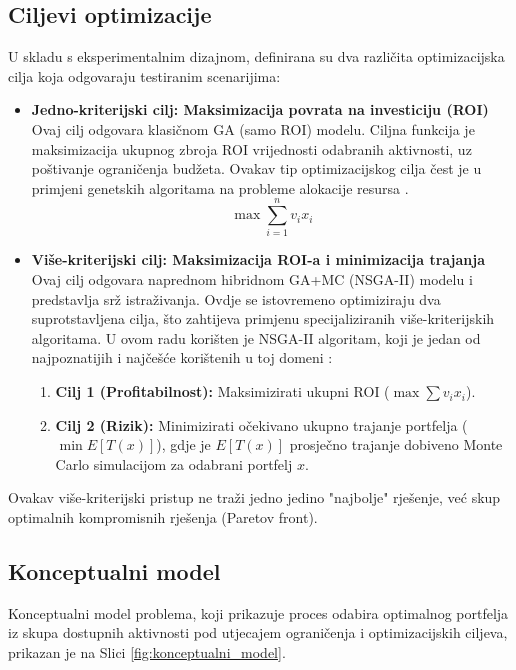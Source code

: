 \subsection{Ciljevi optimizacije}
U skladu s eksperimentalnim dizajnom, definirana su dva različita optimizacijska cilja koja odgovaraju testiranim scenarijima:
\begin{itemize}
    \item \textbf{Jedno-kriterijski cilj: Maksimizacija povrata na investiciju (ROI)}
        Ovaj cilj odgovara klasičnom GA (samo ROI) modelu. Ciljna funkcija je maksimizacija ukupnog zbroja ROI vrijednosti odabranih aktivnosti, uz poštivanje ograničenja budžeta. Ovakav tip optimizacijskog cilja čest je u primjeni genetskih algoritama na probleme alokacije resursa \cite{Goldberg1989}.
    $$ \max \sum_{i=1}^n v_i x_i $$
    \item \textbf{Više-kriterijski cilj: Maksimizacija ROI-a i minimizacija trajanja}
        Ovaj cilj odgovara naprednom hibridnom GA+MC (NSGA-II) modelu i predstavlja srž istraživanja.  Ovdje se istovremeno optimiziraju dva suprotstavljena cilja, što zahtijeva primjenu specijaliziranih više-kriterijskih algoritama. U ovom radu korišten je NSGA-II algoritam, koji je jedan od najpoznatijih i najčešće korištenih u toj domeni \cite{Deb2002}:   
    \begin{enumerate}
        \item \textbf{Cilj 1 (Profitabilnost):} Maksimizirati ukupni ROI ($\max \sum v_i x_i$).
        \item \textbf{Cilj 2 (Rizik):} Minimizirati očekivano ukupno trajanje portfelja ($\min E[T(x)]$), gdje je $E[T(x)]$ prosječno trajanje dobiveno Monte Carlo simulacijom za odabrani portfelj $x$.
    \end{enumerate}
\end{itemize}
Ovakav više-kriterijski pristup ne traži jedno jedino "najbolje" rješenje, već skup optimalnih kompromisnih rješenja (Paretov front).

\subsection{Konceptualni model}
Konceptualni model problema, koji prikazuje proces odabira optimalnog portfelja iz skupa dostupnih aktivnosti pod utjecajem ograničenja i optimizacijskih ciljeva, prikazan je na Slici \ref{fig:konceptualni_model}.

